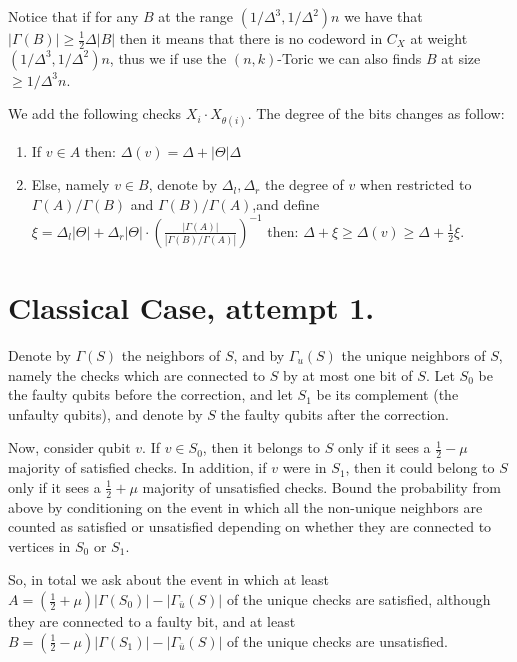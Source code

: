 \documentclass[manuscript,screen,review]{acmart}
\begin{document}
Notice that if for any $B$ at the range $(1/\Delta^{3}, 1/\Delta^{2}) n$ we have that $|\Gamma(B)| \ge \frac{1}{2} \Delta |B|$ then it means that there is no codeword in $C_{X}$ at weight  $(1/\Delta^{3}, 1/\Delta^{2}) n$, thus we if use the $(n,k)$-Toric we can also finds $B$ at size $\ge 1/\Delta^{3} n $. 

We add the following checks $ X_{i} \cdot X_{\theta(i)} $. The degree of the bits changes as follow:   
\begin{enumerate}
  \item If $v \in A$ then: $\Delta(v) = \Delta + |\Theta|\Delta $
  \item Else, namely $v \in B$, denote by $\Delta_{l}, \Delta_{r}$ the degree of $v$ when restricted to $\Gamma(A)/\Gamma(B)$ and  $\Gamma(B)/\Gamma(A)$,and define $\xi = \Delta_{l} |\Theta|    + \Delta_{r}|\Theta| \cdot \left(  \frac{|\Gamma(A)|}{ |\Gamma(B)/\Gamma(A)| } \right)^{-1} $ then: $ \Delta + \xi   \ge \Delta(v) \ge \Delta + \frac{1}{2}\xi$.  
\end{enumerate}


\section{Classical Case, attempt 1.} 
Denote by $\Gamma(S)$ the neighbors of $S$, and by $\Gamma_{u}(S)$ the unique neighbors of $S$, namely the checks which are connected to $S$ by at most one bit of $S$. Let $S_{0}$ be the faulty qubits before the correction, and let $S_{1}$ be its complement (the unfaulty qubits), and denote by $S$ the faulty qubits after the correction.

Now, consider qubit $v$. If $v \in S_{0}$, then it belongs to $S$ only if it sees a $\frac{1}{2} - \mu$ majority of satisfied checks. In addition, if $v$ were in $S_{1}$, then it could belong to $S$ only if it sees a $\frac{1}{2} + \mu$ majority of unsatisfied checks. Bound the probability from above by conditioning on the event in which all the non-unique neighbors are counted as satisfied or unsatisfied depending on whether they are connected to vertices in $S_0$ or $S_1$.

So, in total we ask about the event in which at least $ A =  (\frac{1}{2} + \mu) |\Gamma(S_{0})| - |\Gamma_{\bar{u}}(S)| $ of the unique checks are satisfied, although they are connected to a faulty bit, and at least $ B =  (\frac{1}{2} - \mu) |\Gamma(S_{1})| - |\Gamma_{\bar{u}}(S)| $ of the unique checks are unsatisfied.
\end{document}
